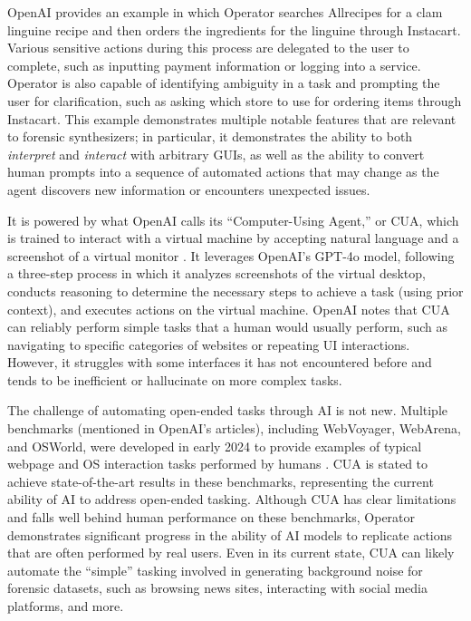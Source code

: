 \documentclass[letterpaper,12pt]{report}
\begin{document}
OpenAI provides an example in which Operator searches Allrecipes for a
clam linguine recipe and then orders the ingredients for the linguine
through Instacart. Various sensitive actions during this process are
delegated to the user to complete, such as inputting payment information
or logging into a service. Operator is also capable of identifying
ambiguity in a task and prompting the user for clarification, such as
asking which store to use for ordering items through Instacart. This
example demonstrates multiple notable features that are relevant to
forensic synthesizers; in particular, it demonstrates the ability to
both \emph{interpret} and \emph{interact} with arbitrary GUIs, as well
as the ability to convert human prompts into a sequence of automated
actions that may change as the agent discovers new information or
encounters unexpected issues.

It is powered by what OpenAI calls its ``Computer-Using Agent,'' or CUA,
which is trained to interact with a virtual machine by accepting natural
language and a screenshot of a virtual monitor
\cite{openaiComputerUsingAgent2025}. It leverages OpenAI's GPT-4o
model, following a three-step process in which it analyzes screenshots
of the virtual desktop, conducts reasoning to determine the necessary
steps to achieve a task (using prior context), and executes actions on
the virtual machine. OpenAI notes that CUA can reliably perform simple
tasks that a human would usually perform, such as navigating to specific
categories of websites or repeating UI interactions. However, it
struggles with some interfaces it has not encountered before and tends
to be inefficient or hallucinate on more complex tasks.

The challenge of automating open-ended tasks through AI is not new.
Multiple benchmarks (mentioned in OpenAI's articles), including
WebVoyager, WebArena, and OSWorld, were developed in early 2024 to
provide examples of typical webpage and OS interaction tasks performed
by humans
\cite{zhouWebArenaRealisticWeb2024,heWebVoyagerBuildingEndtoEnd2024,xieOSWorldBenchmarkingMultimodal2024}.
CUA is stated to achieve state-of-the-art results in these benchmarks,
representing the current ability of AI to address open-ended tasking.
Although CUA has clear limitations and falls well behind human
performance on these benchmarks, Operator demonstrates significant
progress in the ability of AI models to replicate actions that are often
performed by real users. Even in its current state, CUA can likely
automate the ``simple'' tasking involved in generating background noise
for forensic datasets, such as browsing news sites, interacting with
social media platforms, and more.
\end{document}
